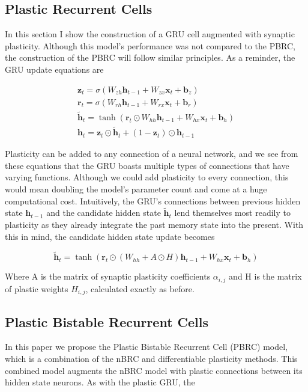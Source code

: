 \subsection*{Plastic Recurrent Cells}

In this section I show the construction of a GRU cell augmented with synaptic plasticity. Although this model's performance was not compared to the PBRC, the construction of the PBRC will follow similar principles.
As a reminder, the GRU update equations are

\begin{gather*}
	\mathbf{z}_t = \sigma(W_{zh} \mathbf{h}_{t-1} + W_{zx} \mathbf{x}_t + \mathbf{b}_z)\\
	\mathbf{r}_t = \sigma(W_{rh} \mathbf{h}_{t-1} + W_{rx} \mathbf{x}_t + \mathbf{b}_r)\\
	\mathbf{\tilde{h}}_t = \tanh(\mathbf{r}_t \odot W_{hh} \mathbf{h}_{t-1} + W_{hx} \mathbf{x}_t + \mathbf{b}_h)\\
	\mathbf{h}_t = \mathbf{z}_t \odot \mathbf{\tilde{h}}_t + (1 - \mathbf{z}_t) \odot \mathbf{h}_{t-1}
\end{gather*}

Plasticity can be added to any connection of a neural network, and we see from these equations that the GRU boasts multiple types of connections that have varying functions. Although we could add plasticity to every connection, this would mean doubling the model's parameter count and come at a huge computational cost. Intuitively, the GRU's connections between previous hidden state \(\mathbf{h}_{t-1}\) and the candidate hidden state \(\mathbf{\tilde{h}}_t\) lend themselves most readily to plasticity as they already integrate the past memory state into the present. With this in mind, the candidate hidden state update becomes

\[ \mathbf{\tilde{h}}_t = \tanh(\mathbf{r}_t \odot (W_{hh} + A \odot H) \mathbf{h}_{t-1} + W_{hx} \mathbf{x}_t + \mathbf{b}_h) \]

Where A is the matrix of synaptic plasticity coefficients \(\alpha_{i,j}\) and H is the matrix of plastic weights \(H_{i,j}\), calculated exactly as before.

\subsection*{Plastic Bistable Recurrent Cells}

In this paper we propose the Plastic Bistable Recurrent Cell (PBRC) model, which is a combination of the nBRC and differentiable plasticity methods. This combined model augments the nBRC model with plastic connections between its hidden state neurons. As with the plastic GRU, the 
